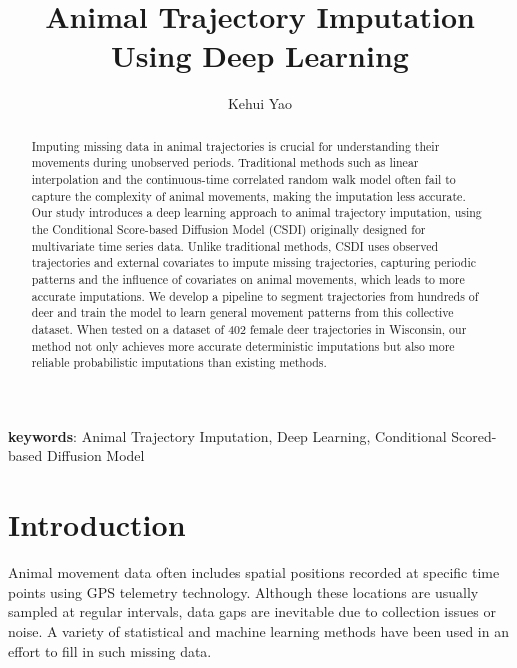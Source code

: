 \documentclass[11pt]{article}
\title{Animal Trajectory Imputation Using Deep Learning}
\author[1]{Kehui Yao}
\affil[1]{Department of Statistics, University of Wisconsin-Madison}
\date{}
\begin{document}
\maketitle

\begin{abstract}
Imputing missing data in animal trajectories is crucial for understanding their movements during unobserved periods. Traditional methods such as linear interpolation and the continuous-time correlated random walk model often fail to capture the complexity of animal movements, making the imputation less accurate. Our study introduces a deep learning approach to animal trajectory imputation, using the Conditional Score-based Diffusion Model (CSDI) originally designed for multivariate time series data. Unlike traditional methods, CSDI uses observed trajectories and external covariates to impute missing trajectories, capturing periodic patterns and the influence of covariates on animal movements, which leads to more accurate imputations. We develop a pipeline to segment trajectories from hundreds of deer and train the model to learn general movement patterns from this collective dataset. When tested on a dataset of 402 female deer trajectories in Wisconsin, our method not only achieves more accurate deterministic imputations but also more reliable probabilistic imputations than existing methods.

\end{abstract}

\textbf{keywords}: Animal Trajectory Imputation, Deep Learning, Conditional Scored-based Diffusion Model
\section{Introduction}
Animal movement data often includes spatial positions recorded at specific time points using GPS telemetry technology. Although these locations are usually sampled at regular intervals, data gaps are inevitable due to collection issues or noise. A variety of statistical and machine learning methods have been used in an effort to fill in such missing data.
\end{document}
